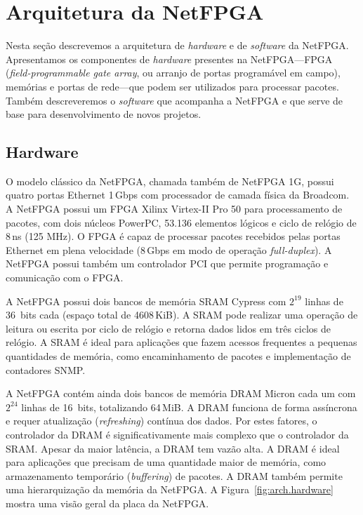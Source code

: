 \newpage
\section{Arquitetura da NetFPGA}
\label{sec:arch}

Nesta seção descrevemos a arquitetura de \emph{hardware} e de
\emph{software} da NetFPGA.  Apresentamos os componentes de
\emph{hardware} presentes na NetFPGA---FPGA (\emph{field-programmable
gate array}, ou arranjo de portas programável em campo), memórias e
portas de rede---que podem ser utilizados para processar pacotes.
Também descreveremos o \emph{software} que acompanha a NetFPGA e que
serve de base para desenvolvimento de novos projetos.

\subsection{Hardware}
\label{sec:arch.hw}

O modelo clássico da NetFPGA, chamada também de NetFPGA 1G, possui
quatro portas Ethernet 1\,Gbps com processador de camada física da
Broadcom.  A NetFPGA possui um FPGA Xilinx Virtex-II Pro 50 para
processamento de pacotes, com dois núcleos PowerPC, 53.136 elementos
lógicos e ciclo de relógio de 8\,ns (125 MHz).  O FPGA é capaz de
processar pacotes recebidos pelas portas Ethernet em plena velocidade
(8\,Gbps em modo de operação \emph{full-duplex}).  A NetFPGA possui
também um controlador PCI que permite programação e comunicação com o
FPGA.

A NetFPGA possui dois bancos de memória SRAM Cypress com $2^{19}$ linhas
de 36~bits cada (espaço total de 4608\,KiB).  A SRAM pode realizar uma
operação de leitura ou escrita por ciclo de relógio e retorna dados
lidos em três ciclos de relógio.  A SRAM é ideal para aplicações que
fazem acessos frequentes a pequenas quantidades de memória, como
encaminhamento de pacotes e implementação de contadores SNMP.

A NetFPGA contém ainda dois bancos de memória DRAM Micron cada um com
$2^{24}$ linhas de 16~bits, totalizando 64\,MiB.  A DRAM funciona de
forma assíncrona e requer atualização (\emph{refreshing}) contínua dos
dados.  Por estes fatores, o controlador da DRAM é significativamente
mais complexo que o controlador da SRAM.  Apesar da maior latência, a
DRAM tem vazão alta.  A DRAM é ideal para aplicações que precisam de uma
quantidade maior de memória, como armazenamento temporário
(\emph{buffering}) de pacotes.  A DRAM também permite uma hierarquização
da memória da NetFPGA.  A Figura~\ref{fig:arch.hardware} mostra uma
visão geral da placa da NetFPGA.

